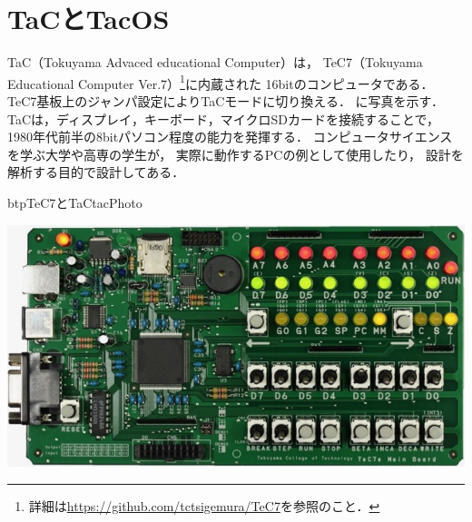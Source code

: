 \chapter{TaCとTacOS}
\label{TacAndTacOS}
TaC（Tokuyama Advaced educational Computer）は，
TeC7（Tokuyama Educational Computer Ver.7）\footnote{
  詳細は\url{https://github.com/tctsigemura/TeC7}を参照のこと．}に内蔵された
16bitのコンピュータである．
TeC7基板上のジャンパ設定によりTaCモードに切り換える．
に写真を示す．
TaCは，ディスプレイ，キーボード，マイクロSDカードを接続することで，
1980年代前半の8bitパソコン程度の能力を発揮する．
コンピュータサイエンスを学ぶ大学や高専の学生が，
実際に動作するPCの例として使用したり，
設計を解析する目的で設計してある．

\begin{myfig}{btp}{TeC7とTaC}{tacPhoto}
  \begin{minipage}{0.58\columnwidth}
    \begin{center}
      \includegraphics[scale=0.35]{Photo/TeC7.jpg}\\
      \label{fig:tec7Photo}
    \end{center}
  \end{minipage}
  \begin{minipage}{0.38\columnwidth}
    \begin{center}

\end{center}
\end{minipage}
\end{myfig}
